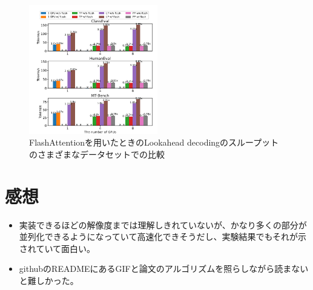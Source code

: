 \documentclass[uplatex]{jsarticle}
\theoremstyle{remark}
\begin{document}
\begin{figure}
  \centering
  \includegraphics[width=0.5\textwidth]{img/lookahead_decoding/fig6.png}
  \caption{FlashAttentionを用いたときのLookahead decodingのスループットのさまざまなデータセットでの比較}
  \label{fig:throughput_comparison_with_flash}
\end{figure}

\section{感想}
\begin{itemize}
  \item 実装できるほどの解像度までは理解しきれていないが、かなり多くの部分が並列化できるようになっていて高速化できそうだし、実験結果でもそれが示されていて面白い。
  \item githubのREADMEにあるGIFと論文のアルゴリズムを照らしながら読まないと難しかった。
\end{itemize}



\end{document}
